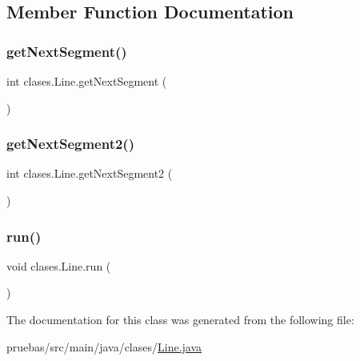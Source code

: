 \subsection{Member Function Documentation}
\mbox{\label{classclases_1_1_line_a59a8aaaed373c81611fe1f003012d0bd}} 
\subsubsection{\texorpdfstring{get\+Next\+Segment()}{getNextSegment()}}
{\footnotesize\ttfamily int clases.\+Line.\+get\+Next\+Segment (\begin{DoxyParamCaption}{ }\end{DoxyParamCaption})}

\mbox{\label{classclases_1_1_line_af330f196c35a61d78325b45a8b590357}} 
\subsubsection{\texorpdfstring{get\+Next\+Segment2()}{getNextSegment2()}}
{\footnotesize\ttfamily int clases.\+Line.\+get\+Next\+Segment2 (\begin{DoxyParamCaption}{ }\end{DoxyParamCaption})}

\mbox{\label{classclases_1_1_line_a5746922f975ee20fc0cbe9533f97a1db}} 
\subsubsection{\texorpdfstring{run()}{run()}}
{\footnotesize\ttfamily void clases.\+Line.\+run (\begin{DoxyParamCaption}{ }\end{DoxyParamCaption})}



The documentation for this class was generated from the following file\+:\begin{DoxyCompactItemize}
\item 
pruebas/src/main/java/clases/\mbox{\hyperlink{_line_8java}{Line.\+java}}\end{DoxyCompactItemize}
